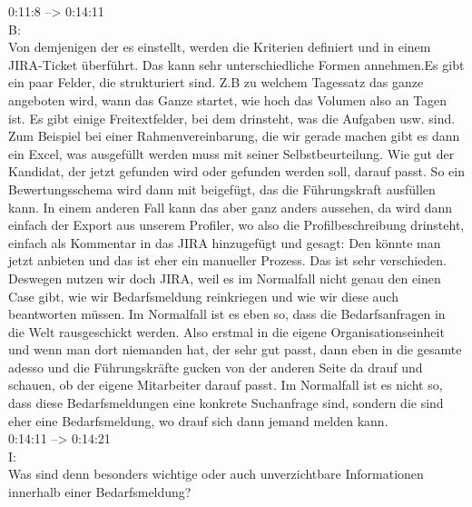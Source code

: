 0:11:8 --> 0:14:11\\
B:\\
Von demjenigen der es einstellt, werden die Kriterien definiert und in einem JIRA-Ticket überführt. Das kann sehr unterschiedliche Formen annehmen.Es gibt ein paar Felder, die strukturiert sind. Z.B zu welchem Tagessatz das ganze angeboten wird, wann das Ganze startet, wie hoch das Volumen also an Tagen ist. Es gibt einige Freitextfelder, bei dem drinsteht, was die Aufgaben usw. sind. Zum Beispiel bei einer Rahmenvereinbarung, die wir gerade machen gibt es dann ein Excel, was ausgefüllt werden muss mit seiner Selbstbeurteilung. Wie gut der Kandidat, der jetzt gefunden wird oder gefunden werden soll, darauf passt. So ein Bewertungsschema wird dann mit beigefügt, das die Führungskraft ausfüllen kann. In einem anderen Fall kann das aber ganz anders aussehen, da wird dann einfach der Export aus unserem Profiler, wo also die Profilbeschreibung drinsteht, einfach als Kommentar in das JIRA hinzugefügt und gesagt: Den könnte man jetzt anbieten und das ist eher ein manueller Prozess. Das ist sehr verschieden. Deswegen nutzen wir doch JIRA, weil es im Normalfall nicht genau den einen Case gibt, wie wir Bedarfsmeldung reinkriegen und wie wir diese auch beantworten müssen. Im Normalfall ist es eben so, dass die Bedarfsanfragen in die Welt rausgeschickt werden. Also erstmal in die eigene Organisationseinheit und wenn man dort niemanden hat, der sehr gut passt, dann eben in die gesamte adesso und die Führungskräfte gucken von der anderen Seite da drauf und schauen, ob der eigene Mitarbeiter darauf passt. Im Normalfall ist es nicht so, dass diese Bedarfsmeldungen eine konkrete Suchanfrage sind, sondern die sind eher eine Bedarfsmeldung, wo drauf sich dann jemand melden kann.\\

0:14:11 --> 0:14:21\\
I:\\
Was sind denn besonders wichtige oder auch unverzichtbare Informationen innerhalb einer Bedarfsmeldung?\\

